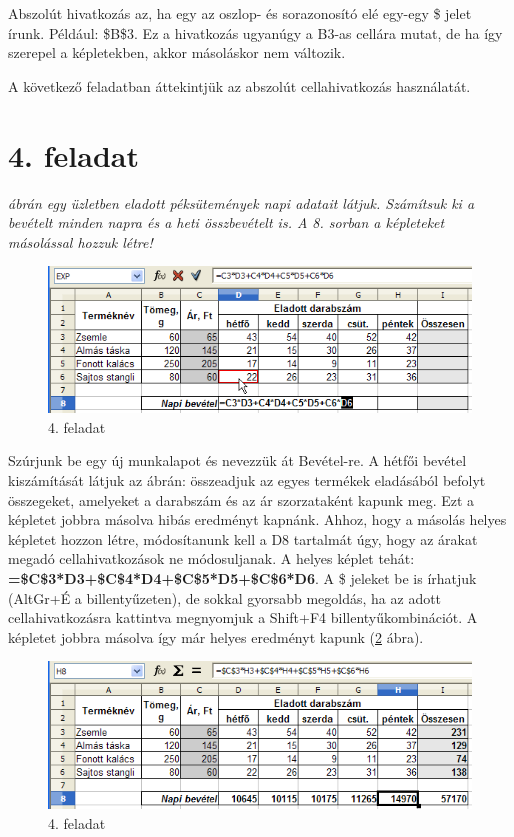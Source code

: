 Abszolút hivatkozás az, ha egy az oszlop- és sorazonosító
elé egy-egy \$ jelet írunk. Például: \$B\$3. Ez a hivatkozás
ugyanúgy a B3-as cellára mutat, de ha így szerepel a
képletekben, akkor másoláskor nem változik.

A következő feladatban áttekintjük az abszolút
cellahivatkozás használatát.

\section{4. feladat}

{\itshape
{} ábrán egy üzletben eladott péksütemények napi adatait
látjuk. Számítsuk ki a bevételt minden napra és a heti
összbevételt is. A 8. sorban a képleteket másolással hozzuk
létre!}

\begin{figure}[!h]
\begin{center}
\includegraphics[width=15.185cm]{oocalcv2-img25.png}
\caption{4. feladat}\label{4-feladat}
\end{center}
\end{figure}

Szúrjunk be egy új munkalapot és nevezzük át Bevétel-re. A
hétfői bevétel kiszámítását látjuk az ábrán:
összeadjuk az egyes termékek eladásából befolyt összegeket,
amelyeket a darabszám és az ár szorzataként kapunk meg. Ezt a
képletet jobbra másolva hibás eredményt kapnánk. Ahhoz, hogy
a másolás helyes képletet hozzon létre, módosítanunk kell a
D8 tartalmát úgy, hogy az árakat megadó cellahivatkozások ne
módosuljanak. A helyes képlet tehát:
\textsf{\textbf{=\$C\$3*D3+\$C\$4*D4+\$C\$5*D5+\$C\$6*D6}}.
A \$ jeleket be is írhatjuk (AltGr+É a billentyűzeten), de
sokkal gyorsabb megoldás, ha az adott cellahivatkozásra kattintva
megnyomjuk a Shift+F4 billentyűkombinációt. A képletet jobbra
másolva így már helyes eredményt kapunk (\ref{4-feladat-2} ábra).

\begin{figure}[!h]
\begin{center}
\includegraphics[width=15.185cm]{oocalcv2-img26.png}
\caption{4. feladat}\label{4-feladat-2}
\end{center}
\end{figure}


